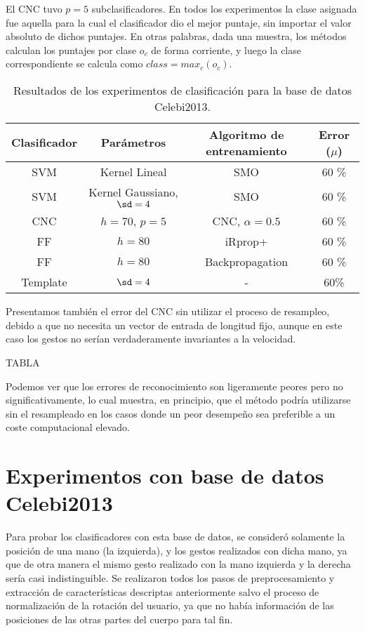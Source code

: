 El CNC tuvo $p=5$ subclasificadores. En todos los experimentos la clase asignada fue aquella para la cual el clasificador dio el mejor puntaje, sin importar el valor absoluto de dichos puntajes. En otras palabras, dada una muestra, los métodos calculan los puntajes por clase $o_c$ de forma corriente, y luego la clase correspondiente se calcula como $class=max_c(o_c)$.


\begin{table}[h]
\centering
\small
\begin{tabular}{|c|c|c|c|}
\hline Clasificador & Parámetros & Algoritmo de entrenamiento & Error ($\mu$) \\ 
\hline SVM & Kernel Lineal & SMO &  60 \% \\ 
\hline SVM & Kernel Gaussiano, $\sd=4$ & SMO & 60 \%  \\ 
\hline CNC & $h=70$, $p=5$ & CNC, $\alpha=0.5$ & 60 \% \\ 
\hline FF & $h=80$ & iRprop+ &  60 \% \\ 
\hline FF & $h=80$ &  Backpropagation &  60 \% \\ 
\hline Template & $\sd=4$ & - & 60\% \\ 
\hline 
\end{tabular}
\caption{Resultados de los experimentos de clasificación para la base de datos Celebi2013.} 
\end{table}

Presentamos también el error del CNC sin utilizar el proceso de resampleo, debido a que no necesita un vector de entrada de longitud fijo, aunque en este caso los gestos no serían verdaderamente invariantes a la velocidad.

TABLA

Podemos ver que los errores de reconocimiento son ligeramente peores pero no significativamente, lo cual muestra, en principio, que el método podría utilizarse sin el resampleado en los casos donde un peor desempeño sea preferible a un coste computacional elevado.


\section{Experimentos con base de datos Celebi2013}

Para probar los clasificadores con esta base de datos, se consideró solamente la posición de una mano (la izquierda), y los gestos realizados con dicha mano, ya que de otra manera el mismo gesto realizado con la mano izquierda y la derecha sería casi indistinguible. Se realizaron todos los pasos de preprocesamiento y extracción de características descriptas anteriormente salvo el proceso de normalización de la rotación del usuario, ya que no había información de las posiciones de las otras partes del cuerpo para tal fin.

